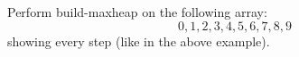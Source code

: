 Perform build-maxheap on the following array:
\[
0,1,2,3,4,5,6,7,8,9
\]
showing every step (like in the above example).
